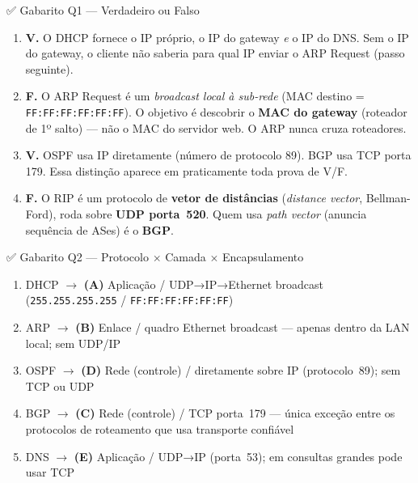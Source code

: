 \documentclass[11pt,a4paper]{article}
\begin{document}
\begin{gabaritocaixa}{✅ Gabarito Q1 --- Verdadeiro ou Falso}
\begin{enumerate}[label=(\alph*)]
    \item \textbf{V.} O DHCP fornece o IP próprio, o IP do gateway \emph{e} o IP do DNS. Sem o IP do gateway, o cliente não saberia para qual IP enviar o ARP Request (passo seguinte).
    \item \textbf{F.} O ARP Request é um \emph{broadcast local à sub-rede} (MAC destino = \texttt{FF:FF:FF:FF:FF:FF}). O objetivo é descobrir o \textbf{MAC do gateway} (roteador de 1º salto) --- não o MAC do servidor web. O ARP nunca cruza roteadores.
    \item \textbf{V.} OSPF usa IP diretamente (número de protocolo 89). BGP usa TCP porta 179. Essa distinção aparece em praticamente toda prova de V/F.
    \item \textbf{F.} O RIP é um protocolo de \textbf{vetor de distâncias} (\textit{distance vector}, Bellman-Ford), roda sobre \textbf{UDP porta~520}. Quem usa \textit{path vector} (anuncia sequência de ASes) é o \textbf{BGP}.
\end{enumerate}
\end{gabaritocaixa}

\begin{gabaritocaixa}{✅ Gabarito Q2 --- Protocolo $\times$ Camada $\times$ Encapsulamento}
\begin{enumerate}[label=(\arabic*)]
    \item DHCP $\to$ \textbf{(A)} Aplicação / UDP→IP→Ethernet broadcast (\texttt{255.255.255.255} / \texttt{FF:FF:FF:FF:FF:FF})
    \item ARP $\to$ \textbf{(B)} Enlace / quadro Ethernet broadcast --- apenas dentro da LAN local; sem UDP/IP
    \item OSPF $\to$ \textbf{(D)} Rede (controle) / diretamente sobre IP (protocolo~89); sem TCP ou UDP
    \item BGP $\to$ \textbf{(C)} Rede (controle) / TCP porta~179 --- única exceção entre os protocolos de roteamento que usa transporte confiável
    \item DNS $\to$ \textbf{(E)} Aplicação / UDP→IP (porta~53); em consultas grandes pode usar TCP
\end{enumerate}
\end{gabaritocaixa}
\end{document}
